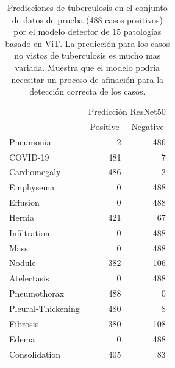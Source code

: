 \begin{table}[!ht]
    \centering
    \begin{tabular}{lcr}
                                   & \multicolumn{2}{c}{Predicción ResNet50}                                \\ \cline{2-3}
    \multicolumn{1}{l|}{}          & \multicolumn{1}{c|}{Positive} & \multicolumn{1}{c|}{Negative} \\ \hline
    \multicolumn{1}{|l|}{Pneumonia}& \multicolumn{1}{r|}{2}      & \multicolumn{1}{r|}{486}      \\ \hline
    \multicolumn{1}{|l|}{COVID-19}  & \multicolumn{1}{r|}{481}        & \multicolumn{1}{r|}{7}     \\ \hline
    \multicolumn{1}{|l|}{Cardiomegaly}  & \multicolumn{1}{r|}{486}        & \multicolumn{1}{r|}{2}     \\ \hline
    \multicolumn{1}{|l|}{Emphysema}  & \multicolumn{1}{r|}{0}        & \multicolumn{1}{r|}{488}     \\ \hline
    \multicolumn{1}{|l|}{Effusion}  & \multicolumn{1}{r|}{0}        & \multicolumn{1}{r|}{488}     \\ \hline
    \multicolumn{1}{|l|}{Hernia}  & \multicolumn{1}{r|}{421}        & \multicolumn{1}{r|}{67}     \\ \hline
    \multicolumn{1}{|l|}{Infiltration}  & \multicolumn{1}{r|}{0}        & \multicolumn{1}{r|}{488}     \\ \hline
    \multicolumn{1}{|l|}{Mass}  & \multicolumn{1}{r|}{0}        & \multicolumn{1}{r|}{488}     \\ \hline
    \multicolumn{1}{|l|}{Nodule}  & \multicolumn{1}{r|}{382}        & \multicolumn{1}{r|}{106}     \\ \hline
    \multicolumn{1}{|l|}{Atelectasis}  & \multicolumn{1}{r|}{0}        & \multicolumn{1}{r|}{488}     \\ \hline
    \multicolumn{1}{|l|}{Pneumothorax}  & \multicolumn{1}{r|}{488}        & \multicolumn{1}{r|}{0}     \\ \hline
    \multicolumn{1}{|l|}{Pleural-Thickening }  & \multicolumn{1}{r|}{480}        & \multicolumn{1}{r|}{8}     \\ \hline
    \multicolumn{1}{|l|}{Fibrosis}  & \multicolumn{1}{r|}{380}        & \multicolumn{1}{r|}{108}     \\ \hline
    \multicolumn{1}{|l|}{Edema}  & \multicolumn{1}{r|}{0}        & \multicolumn{1}{r|}{488}     \\ \hline
    \multicolumn{1}{|l|}{Consolidation}  & \multicolumn{1}{r|}{405}        & \multicolumn{1}{r|}{83}     \\ \hline


    \end{tabular}
    \caption{Predicciones de tuberculosis en el conjunto de datos de prueba (488 casos positivos) por el modelo
             detector de 15 patologías basado en ViT. La predicción para los casos no vistos de tuberculosis
             es mucho mas variada. Muestra que el modelo podría necesitar un proceso de afinación para la
             detección correcta de los casos.}
    \label{table_tb1vit_15}
\end{table}
